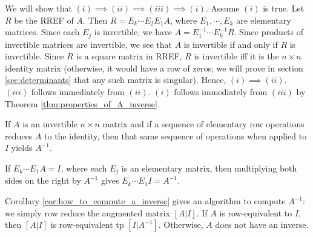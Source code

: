 \documentclass[12pt,letterpaper,reqno]{article}
\numberwithin{equation}{section}
\begin{document}
\begin{pf}
We will show that $(i) \implies (ii) \implies (iii) \implies (i)$. Assume $(i)$ is true. Let $R$ be the RREF of $A$. Then $R=E_k\cdots E_2 E_1 A$, where $E_1,\cdots,E_k$ are elementary matrices. Since each $E_j$ is invertible, we have $A=E_1^{-1} \cdots E_k^{-1}R$. Since products of invertible matrices are invertible, we see that $A$ is invertible if and only if $R$ is invertible. Since $R$ is a square matrix in RREF, $R$ is invertible iff it is the $n \times n$ identity matrix (otherwise, it would have a row of zeros; we will prove in section \ref{sec:determinants} that any such matrix is singular). Hence, $(i) \implies (ii)$. $(iii)$ follows immediately from $(ii)$. $(i)$ follows immediately from $(iii)$ by Theorem \ref{thm:properties_of_A_inverse}.	
\end{pf}

\begin{cor}\label{cor:how_to_compute_a_inverse}
If $A$ is an invertible $n \times n$ matrix and if a sequence of elementary row operations reduces $A$ to the identity, then that same sequence of operations when applied to $I$ yields $A^{-1}$.	
\end{cor}

\begin{pf}
If $E_k \cdots E_1 A=I$, where each $E_j$ is an elementary matrix, then multiplying both sides on the right by $A^{-1}$ gives $E_k \cdots E_1 I=A^{-1}$.	
\end{pf}

Corollary \ref{cor:how_to_compute_a_inverse} gives an algorithm to compute $A^{-1}$: we simply row reduce the augmented matrix $[A|I]$. If $A$ is row-equivalent to $I$, then $[A|I]$ is row-equivalent tp $[I|A^{-1}]$. Otherwise, $A$ does not have an inverse.
\end{document}
